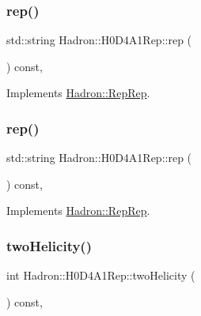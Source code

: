 \subsubsection{\texorpdfstring{rep()}{rep()}\hspace{0.1cm}{\footnotesize\ttfamily [2/3]}}
{\footnotesize\ttfamily std\+::string Hadron\+::\+H0\+D4\+A1\+Rep\+::rep (\begin{DoxyParamCaption}{ }\end{DoxyParamCaption}) const\hspace{0.3cm}{\ttfamily [inline]}, {\ttfamily [virtual]}}



Implements \mbox{\hyperlink{structHadron_1_1RepRep_ab3213025f6de249f7095892109575fde}{Hadron\+::\+Rep\+Rep}}.

\mbox{\label{structHadron_1_1H0D4A1Rep_afbedc9857e7215106a2225ff351ada68}} 
\subsubsection{\texorpdfstring{rep()}{rep()}\hspace{0.1cm}{\footnotesize\ttfamily [3/3]}}
{\footnotesize\ttfamily std\+::string Hadron\+::\+H0\+D4\+A1\+Rep\+::rep (\begin{DoxyParamCaption}{ }\end{DoxyParamCaption}) const\hspace{0.3cm}{\ttfamily [inline]}, {\ttfamily [virtual]}}



Implements \mbox{\hyperlink{structHadron_1_1RepRep_ab3213025f6de249f7095892109575fde}{Hadron\+::\+Rep\+Rep}}.

\mbox{\label{structHadron_1_1H0D4A1Rep_a2aa89f84616ec32830d7b607b5a0b513}} 
\subsubsection{\texorpdfstring{twoHelicity()}{twoHelicity()}\hspace{0.1cm}{\footnotesize\ttfamily [1/2]}}
{\footnotesize\ttfamily int Hadron\+::\+H0\+D4\+A1\+Rep\+::two\+Helicity (\begin{DoxyParamCaption}{ }\end{DoxyParamCaption}) const\hspace{0.3cm}{\ttfamily [inline]}, {\ttfamily [virtual]}}

